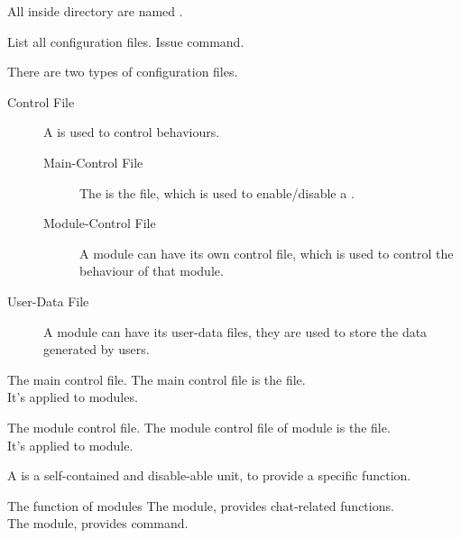 \label{ch:concept}

All  inside \configdir directory are named .

\begin{tips}{List all configuration files.}
    Issue  command.
\end{tips}

\begin{note}{There are two types of configuration files.}
    \begin{description}
        \item[Control File] {A  is used to control behaviours.}
        \begin{description}
            \item[Main-Control File] The  is the \mainconfig file, which is used to enable/disable a .
            \item[Module-Control File] A module can have its own control file, which is used to control the behaviour of that module.
        \end{description}

        \item[User-Data File] A module can have its user-data files, they are used to store the data generated by users.
    \end{description}
\end{note}


\begin{example}{The main control file.}
    The main control file is the \mainconfig file. \\
    It's applied to  modules.
\end{example}

\begin{example}{The module control file.}
    The module control file of  module is the  file. \\
    It's applied to  module.
\end{example}

\clearpage
{}

A  is a self-contained and disable-able unit, to provide a specific function.

\begin{example}{The function of modules}
    The  module, provides chat-related functions. \\
    The  module, provides  command.
\end{example}

